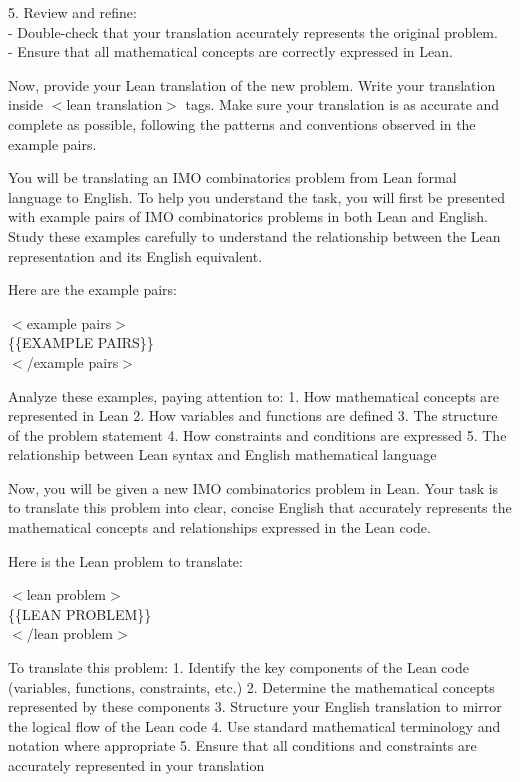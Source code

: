 \begin{tcolorbox}
5. Review and refine: \\
   - Double-check that your translation accurately represents the original problem. \\
   - Ensure that all mathematical concepts are correctly expressed in Lean.

Now, provide your Lean translation of the new problem. Write your translation inside $<$lean translation$>$ tags. Make sure your translation is as accurate and complete as possible, following the patterns and conventions observed in the example pairs.

\end{tcolorbox}




\begin{tcolorbox}[enhanced, breakable, rounded corners, 
    colback=brown!5!white, colframe=brown!75!black,
    colbacktitle=brown!85!black, fonttitle=\bfseries, coltitle=white,
    title = Auto Formalization Lean to English Prompt]
\setlength{\parskip}{1em}
You will be translating an IMO combinatorics problem from Lean formal language to English. To help you understand the task, you will first be presented with example pairs of IMO combinatorics problems in both Lean and English. Study these examples carefully to understand the relationship between the Lean representation and its English equivalent.

Here are the example pairs:

$<$example pairs$>$\\
\{\{EXAMPLE PAIRS\}\}\\
$<$/example pairs$>$

Analyze these examples, paying attention to:
1. How mathematical concepts are represented in Lean
2. How variables and functions are defined
3. The structure of the problem statement
4. How constraints and conditions are expressed
5. The relationship between Lean syntax and English mathematical language

Now, you will be given a new IMO combinatorics problem in Lean. Your task is to translate this problem into clear, concise English that accurately represents the mathematical concepts and relationships expressed in the Lean code.

Here is the Lean problem to translate:

$<$lean problem$>$\\
\{\{LEAN PROBLEM\}\}\\
$<$/lean problem$>$

To translate this problem:
1. Identify the key components of the Lean code (variables, functions, constraints, etc.)
2. Determine the mathematical concepts represented by these components
3. Structure your English translation to mirror the logical flow of the Lean code
4. Use standard mathematical terminology and notation where appropriate
5. Ensure that all conditions and constraints are accurately represented in your translation


\end{tcolorbox}
